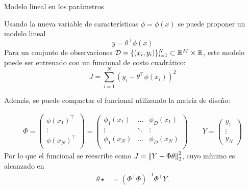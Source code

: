 \documentclass[9pt]{beamer}
\begin{document}
\begin{frame}{Modelo lineal en los parámetros}

Usando la nueva variable de  características $\phi=\phi(x)$ se puede proponer un modelo lineal
\begin{equation*}
    y = \theta^\top\phi(x)
\end{equation*} \pause
Para un conjunto de observaciones ${\mathcal D} = \{(x_i,y_i)\}_{i=1}^N \subset\mathbb{R}^M\times\mathbb{R}$, este modelo puede ser entrenado con un funcional de costo cuadrático:
\begin{equation*}
	J = \sum_{i=1}^N(y_i - \theta^\top\phi(x_i))^2
	\end{equation*} \pause

Además, se puede compactar el funcional utilizando la matriz de diseño:

\begin{align*}
    \Phi = 
    \left( \begin{matrix} \phi(x_1)^\top\\
    \vdots \\
    \phi(x_N)^\top\\
    \end{matrix} \right)
     = \left( \begin{matrix} \phi_1(x_1)& \ldots & \phi_D(x_1)\\
    \vdots & \ddots & \vdots \\
    \phi_1(x_N) & \ldots & \phi_D(x_N)\\
    \end{matrix} \right)
    \qquad
    Y = \left( \begin{matrix} y_1 \\ \vdots \\ y_N \end{matrix} \right)
\end{align*}\pause
Por lo que el funcional se reescribe como $J=\left\lVert Y-\Phi\theta\right\rVert_2^2$, cuyo mínimo es alcanzado en
\begin{align*}
    \theta{\star}&= (\Phi^\top\Phi)^{-1}\Phi^\top Y\label{eq:nolin_theta}.
\end{align*}

\end{frame}
\end{document}

